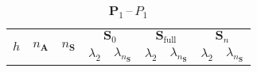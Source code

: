 \documentclass[12pt]{article}
\newcommand{\vect}[1]{\boldsymbol{\mathbf{#1}}}
\begin{document}
\begin{table}[h!]
	\centering
	\caption{$\vect P_1$\,--\,$P_1$} 
	\label{p1p1}
	\begin{tabular}[1.5]{|c|c|c|c|c|c|c|c|c|}
		\hline
		\multirow{2}{*}{$h$} & \multirow{2}{*}{$n_{\vect A}$} & \multirow{2}{*}{$n_{\vect S}$} & \multicolumn{2}{c|}{$\vect S_0$} & \multicolumn{2}{c|}{$\vect S_{\text{full}}$} & \multicolumn{2}{c|}{$\vect S_n$} \\ 
		\cline{4-9}
		& & & $\lambda_2$ & $\lambda_{n_{\vect S}}$ & $\lambda_2$ & $\lambda_{n_{\vect S}}$ & $\lambda_2$ & $\lambda_{n_{\vect S}}$ \\ 
		\hline
		
	\end{tabular}
\end{table}
\end{document}
